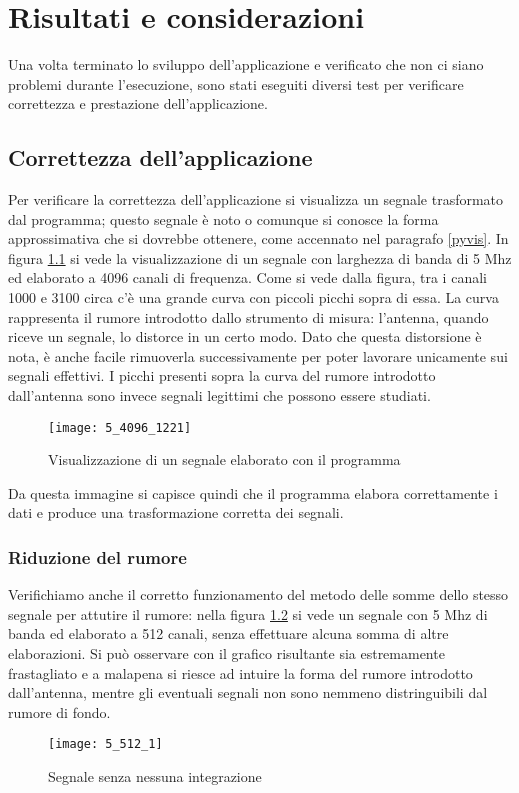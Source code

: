 \chapter{Risultati e considerazioni}
\label{tests}
Una volta terminato lo sviluppo dell'applicazione e verificato che non ci siano
problemi durante l'esecuzione, sono stati eseguiti diversi test per verificare
correttezza e prestazione dell'applicazione.

\section{Correttezza dell'applicazione}
Per verificare la correttezza dell'applicazione si visualizza un segnale
trasformato dal programma; questo segnale \`e noto o comunque si conosce la
forma approssimativa che si dovrebbe ottenere, come accennato nel paragrafo
\ref{pyvis}. In figura \ref{fig:correctness} si vede la visualizzazione di un
segnale con larghezza di banda di 5 Mhz ed elaborato a 4096 canali di frequenza.
Come si vede dalla figura, tra i canali 1000 e 3100 circa c'\`e una grande curva
con piccoli picchi sopra di essa. La curva rappresenta il rumore introdotto
dallo strumento di misura: l'antenna, quando riceve un segnale, lo distorce in
un certo modo. Dato che questa distorsione \`e nota, \`e anche facile rimuoverla
successivamente per poter lavorare unicamente sui segnali effettivi. I picchi
presenti sopra la curva del rumore introdotto dall'antenna sono invece segnali
legittimi che possono essere studiati.
\begin{figure}[htb]
	\begin{center}
		\texttt{[image: 5\_4096\_1221]}
	\end{center}
	\caption{Visualizzazione di un segnale elaborato con il programma}
	\label{fig:correctness}
\end{figure}

Da questa immagine si capisce quindi che il programma elabora correttamente i
dati e produce una trasformazione corretta dei segnali.

\subsection{Riduzione del rumore}
Verifichiamo anche il corretto funzionamento del metodo delle somme dello stesso
segnale per attutire il rumore: nella figura \ref{fig:low_int} si vede un
segnale con 5 Mhz di banda ed elaborato a 512 canali, senza effettuare alcuna
somma di altre elaborazioni. Si pu\`o osservare con il grafico risultante sia
estremamente frastagliato e a malapena si riesce ad intuire la forma del rumore
introdotto dall'antenna, mentre gli eventuali segnali non sono nemmeno
distringuibili dal rumore di fondo.
\begin{figure}[htb]
	\begin{center}
		\texttt{[image: 5\_512\_1]}
	\end{center}
	\caption{Segnale senza nessuna integrazione}
	\label{fig:low_int}
\end{figure}

